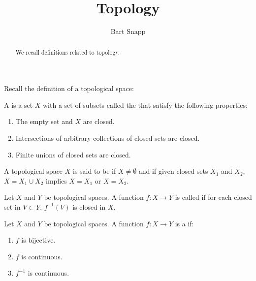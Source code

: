 \documentclass{ximera}
\author{Bart Snapp}
\title{Topology}
\begin{document}
\begin{abstract}
  We recall definitions related to topology. 
\end{abstract}
\maketitle

Recall the definition of a topological space:

\begin{definition}
  A  is a set $X$ with a set of subsets called
  the  that satisfy the following properties:
  \begin{enumerate}
  \item The empty set and $X$ are closed.
  \item Intersections of arbitrary collections of closed sets are
    closed.
  \item Finite unions of closed sets are closed.
  \end{enumerate}
\end{definition}


\begin{definition}
  A topological space $X$ is said to be  if $X\ne
  \emptyset$ and if given closed sets $X_1$ and $X_2$, $X=X_1\cup X_2$
  implies $X=X_1$ or $X=X_2$.
\end{definition}




\begin{definition}
  Let $X$ and $Y$ be topological spaces. A function $f:X\to Y$ is
  called  if for each closed set in $V \subset Y$,
  $f^{-1}(V)$ is closed in $X$.
\end{definition}



\begin{definition}
  Let $X$ and $Y$ be topological spaces. A function $f:X\to Y$ is a
   if:
  \begin{enumerate}
  \item $f$ is bijective.
  \item $f$ is continuous.
  \item $f^{-1}$ is continuous.
  \end{enumerate}
\end{definition}
\end{document}
